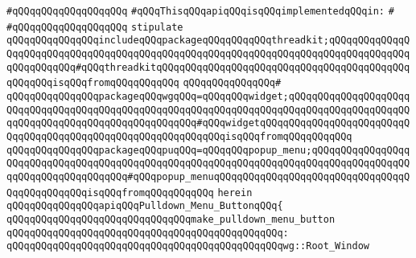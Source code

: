 \verb|#qQQqqQQqqQQqqQQqqQQq|\newline
\newline
\verb|#qQQqThisqQQqapiqQQqisqQQqimplementedqQQqin:|\newline
\verb|#|\newline
\verb|#qQQqqQQqqQQqqQQqqQQq|\newline
\newline
\verb|stipulate|\newline
\verb|qQQqqQQqqQQqqQQqincludeqQQqpackageqQQqqQQqqQQqthreadkit;qQQqqQQqqQQqqQQqqQQqqQQqqQQqqQQqqQQqqQQqqQQqqQQqqQQqqQQqqQQqqQQqqQQqqQQqqQQqqQQqqQQqqQQqqQQqqQQq#qQQqthreadkitqQQqqQQqqQQqqQQqqQQqqQQqqQQqqQQqqQQqqQQqqQQqqQQqqQQqisqQQqfromqQQqqQQqqQQq|\newline
\verb|qQQqqQQqqQQqqQQq#|\newline
\verb|qQQqqQQqqQQqqQQqpackageqQQqwgqQQq=qQQqqQQqwidget;qQQqqQQqqQQqqQQqqQQqqQQqqQQqqQQqqQQqqQQqqQQqqQQqqQQqqQQqqQQqqQQqqQQqqQQqqQQqqQQqqQQqqQQqqQQqqQQqqQQqqQQqqQQqqQQqqQQqqQQqqQQq#qQQqwidgetqQQqqQQqqQQqqQQqqQQqqQQqqQQqqQQqqQQqqQQqqQQqqQQqqQQqqQQqqQQqqQQqisqQQqfromqQQqqQQqqQQq|\newline
\verb|qQQqqQQqqQQqqQQqpackageqQQqpuqQQq=qQQqqQQqpopup_menu;qQQqqQQqqQQqqQQqqQQqqQQqqQQqqQQqqQQqqQQqqQQqqQQqqQQqqQQqqQQqqQQqqQQqqQQqqQQqqQQqqQQqqQQqqQQqqQQqqQQqqQQqqQQq#qQQqpopup_menuqQQqqQQqqQQqqQQqqQQqqQQqqQQqqQQqqQQqqQQqqQQqqQQqisqQQqfromqQQqqQQqqQQq|\newline
\verb|herein|\newline
\newline
\verb|qQQqqQQqqQQqqQQqapiqQQqPulldown_Menu_ButtonqQQq{|\newline
\newline
\verb|qQQqqQQqqQQqqQQqqQQqqQQqqQQqqQQqmake_pulldown_menu_button|\newline
\verb|qQQqqQQqqQQqqQQqqQQqqQQqqQQqqQQqqQQqqQQqqQQqqQQq:|\newline
\verb|qQQqqQQqqQQqqQQqqQQqqQQqqQQqqQQqqQQqqQQqqQQqqQQqwg::Root_Window|\newline
